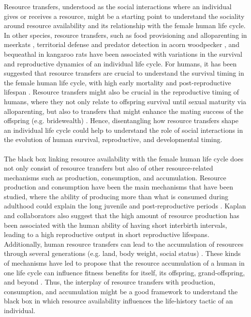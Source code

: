 \documentclass{article}
\begin{document}
Resource transfers, understood as the social interactions where an individual gives or receives a resource, might be a starting point to understand the sociality around resource availability and its relationship with the female human life cycle. In other species, resource transfers, such as food provisioning and alloparenting in meerkats \citep{clutton2016meerkats}, territorial defense and predator detection in acorn woodpecker \citep{koenig2019does}, and bequeathal in kangaroo rats \citep{jones1986survivorship} have been associated with variations in the survival and reproductive dynamics of an individual life cycle. For humans, it has been suggested that resource transfers are crucial to understand the survival timing in the female human life cycle, with high early mortality and post-reproductive lifespan \citep{lee2003rethinking,lee2008sociality,chu2006co}. Resource transfers might also be crucial in the reproductive timing of humans, where they not only relate to offspring survival until sexual maturity via alloparenting, but also to transfers that might enhance the mating success of the offspring (e.g. bridewealth) \citep{jones2015resource}. Hence, disentangling how resource transfers shape an individual life cycle could help to understand the role of social interactions in the evolution of human survival, reproductive, and developmental timing.
\\\\
The black box linking resource availability with the female human life cycle does not only consist of resource transfers but also of other resource-related mechanisms such as production, consumption, and accumulation. Resource production and consumption have been the main mechanisms that have been studied, where the ability of producing more than what is consumed during adulthood could explain the long juvenile and post-reproductive periods \citep{kaplan2000theory}. Kaplan and collaborators also suggest that the high amount of resource production has been associated with the human ability of having short interbirth intervals, leading to a high reproductive output in short reproductive lifespans. Additionally, human resource transfers can lead to the accumulation of resources through several generations (e.g. land, body weight, social status) \citep{mulder2009intergenerational}. These kinds of mechanisms have led to propose that the resource accumulation of a human in one life cycle can influence fitness benefits for itself, its offspring, grand-offspring, and beyond \citep{rogers1990evolutionary,boone1999more,goodman2012low}. Thus, the interplay of resource transfers with production, consumption, and accumulation might be a good framework to understand the black box in which resource availability influences the life-history tactic of an individual.
\end{document}
